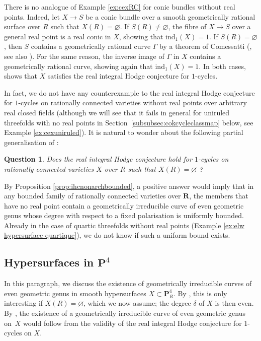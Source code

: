 \documentclass[JEP,XML,SOM,Unicode]{cedram}
\theoremstyle{plain}
\newtheorem{question}[thm]{Question}
\theoremstyle{definition}
\numberwithin{equation}{section}
\renewcommand{\P}{{\mathbf P}}
\newcommand{\R}{{\mathbf R}}
\renewcommand{\emptyset}{\varnothing}
\newcommand{\elw}{\mathrm{ind}}
\begin{document}
There is no analogue of Example \ref{ex:cexRC} for conic bundles without real points. Indeed, let $X\to S$ be a conic bundle over a smooth geometrically rational surface over $R$ such that $X(R)=\emptyset$. If $S(R)\neq\varnothing$, the fibre of $X\to S$ over a general real point is a real conic in $X$, showing that $\elw_1(X)=1$. If $S(R)=\varnothing$, then $S$ contains a geometrically rational curve $\Gamma$ by a theorem of Comessatti (\cite[discussion below Th.\,VI p.\,60]{comessatti}, see also \cite{colliotsanspoint}). For the same reason, the inverse image of $\Gamma$ in $X$ contains a geometrically rational curve, showing again that $\elw_1(X)=1$.
In both cases, \cite[Cor.\,\ref*{BW1-cor:IHC pour solides RC ou CY}]{BW1} shows
that $X$ satisfies the real integral Hodge conjecture for $1$-cycles.

In fact, we do not have any counterexample to the real integral Hodge conjecture for $1$-cycles on rationally connected varieties without real points over arbitrary real closed fields (although
we will see that it fails in general for uniruled threefolds with no real points in Section~\ref{subsubsec:cokcycleclassmap} below, see Example \ref{ex:cexuniruled}). It is natural to wonder about the following partial generalisation of \cite[Quest.\,\ref*{BW1-mainquestion}]{BW1}:

\begin{question}
\label{IHCRCR}
Does the real integral Hodge conjecture hold for $1$-cycles on rationally connected varieties $X$ over $R$ such that $X(R)=\emptyset$ ?
\end{question}

By Proposition \ref{prop:ihcnonarchbounded}, a positive answer would imply that
in any bounded family of rationally connected varieties over $\R$,
the members that have no real point contain a geometrically irreducible curve of even geometric genus whose degree with respect to a fixed polarisation is uniformly bounded.
Already in the case of quartic threefolds without real points (Example \ref{ex:elw hypersurface quartique}), we do not know if such a uniform bound exists.

\subsection{Hypersurfaces in \texorpdfstring{$\P^4$}{𝐏⁴}}
\label{subsec:hypersurfaces in P4}

In this paragraph, we discuss the existence of geometrically irreducible curves of even geometric genus in smooth hypersurfaces $X\subset\P^4_R$. By \cite[Prop.\,\ref*{BW1-prop:parity of genus in irrelevant situations}]{BW1}, this is only interesting if $X(R)=\varnothing$, which we now assume; the degree $\delta$ of $X$ is then even. By \cite[Th.\,\ref*{BW1-th:nohodgetheoreticob}]{BW1}, the existence of a geometrically irreducible curve of even geometric genus on~$X$ would follow from the validity of the real integral Hodge conjecture for $1$-cycles on $X$.
\end{document}
